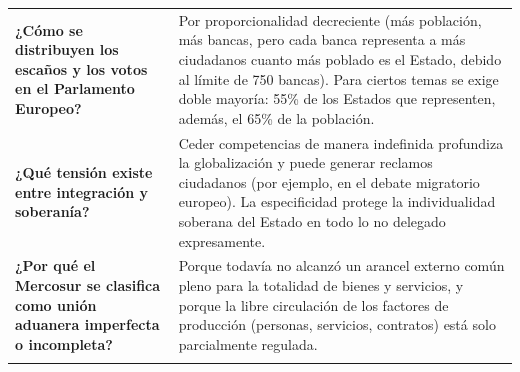 \documentclass[12pt,oneside]{book}
\begin{document}
\begin{longtable}{
    >{\RaggedRight\arraybackslash}p{}
    >{\RaggedRight\arraybackslash}p{}
}
\textbf{¿Cómo se distribuyen los escaños y los votos en el Parlamento Europeo?} &
Por proporcionalidad decreciente (más población, más bancas, pero cada banca representa a más ciudadanos cuanto más poblado es el Estado, debido al límite de 750 bancas). Para ciertos temas se exige doble mayoría: 55\% de los Estados que representen, además, el 65\% de la población. \\
\addlinespace
\cmidrule{1-2}

\textbf{¿Qué tensión existe entre integración y soberanía?} &
Ceder competencias de manera indefinida profundiza la globalización y puede generar reclamos ciudadanos (por ejemplo, en el debate migratorio europeo). La especificidad protege la individualidad soberana del Estado en todo lo no delegado expresamente. \\
\addlinespace
\cmidrule{1-2}

\textbf{¿Por qué el Mercosur se clasifica como unión aduanera imperfecta o incompleta?} &
Porque todavía no alcanzó un arancel externo común pleno para la totalidad de bienes y servicios, y porque la libre circulación de los factores de producción (personas, servicios, contratos) está solo parcialmente regulada. \\
\addlinespace
\midrule


\end{longtable}
\end{document}
